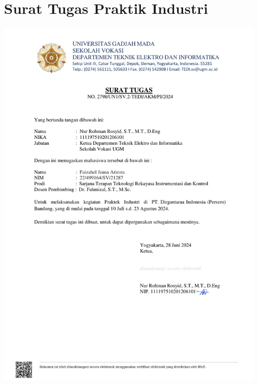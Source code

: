 \newpage
\section{Surat Tugas Praktik Industri}
\includegraphics[scale=0.7]{dokumen/suratTugas.pdf}

\newpage
